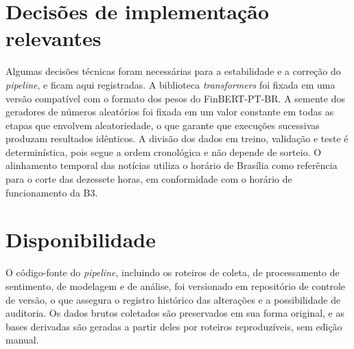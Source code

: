 \section{Decisões de implementação relevantes}

Algumas decisões técnicas foram necessárias para a estabilidade e a correção do \textit{pipeline}, e ficam aqui registradas. A biblioteca \textit{transformers} foi fixada em uma versão compatível com o formato dos pesos do FinBERT-PT-BR. A semente dos geradores de números aleatórios foi fixada em um valor constante em todas as etapas que envolvem aleatoriedade, o que garante que execuções sucessivas produzam resultados idênticos. A divisão dos dados em treino, validação e teste é determinística, pois segue a ordem cronológica e não depende de sorteio. O alinhamento temporal das notícias utiliza o horário de Brasília como referência para o corte das dezessete horas, em conformidade com o horário de funcionamento da B3.

\section{Disponibilidade}

O código-fonte do \textit{pipeline}, incluindo os roteiros de coleta, de processamento de sentimento, de modelagem e de análise, foi versionado em repositório de controle de versão, o que assegura o registro histórico das alterações e a possibilidade de auditoria. Os dados brutos coletados são preservados em sua forma original, e as bases derivadas são geradas a partir deles por roteiros reproduzíveis, sem edição manual.
